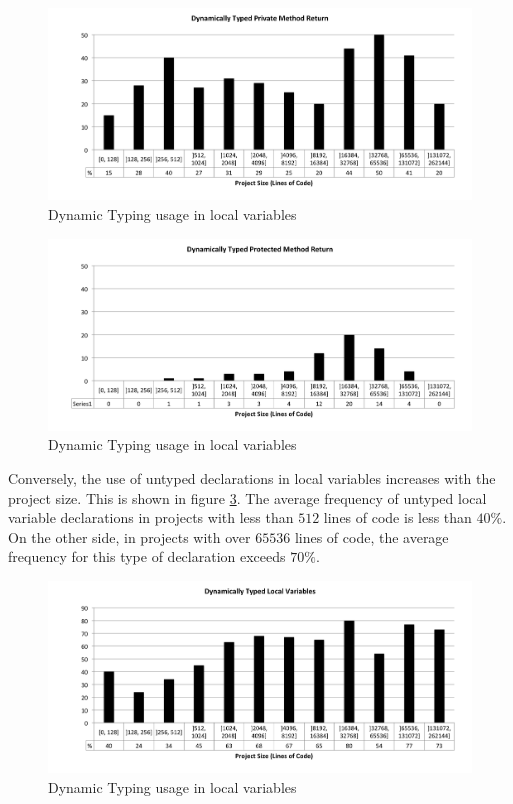 \documentclass[preprint]{sigplanconf}
\begin{document}
\begin{figure}[ht]
\centering 
\includegraphics[width=1\textwidth]{images/size_priMethodReturn} 
\caption{Dynamic Typing usage in local variables}
\label{fig:size_priMethodReturn} 
\end{figure}

\begin{figure}[ht]
\centering 
\includegraphics[width=1\textwidth]{images/size_proMethodReturn} 
\caption{Dynamic Typing usage in local variables}
\label{fig:size_proMethodReturn} 
\end{figure}

Conversely, the use of untyped declarations in local variables increases with the project size. 
This is shown in figure \ref{fig:size_localVariable}. 
The average frequency of untyped local variable declarations in projects with less than $512$ lines of code is less than $40\%$. 
On the other side, in projects with over $65536$ lines of code, the average frequency for this type of declaration exceeds $70\%$.

\begin{figure}[ht]
\centering 
\includegraphics[width=1\textwidth]{images/size_localVariable} 
\caption{Dynamic Typing usage in local variables}
\label{fig:size_localVariable} 
\end{figure}
\end{document}
